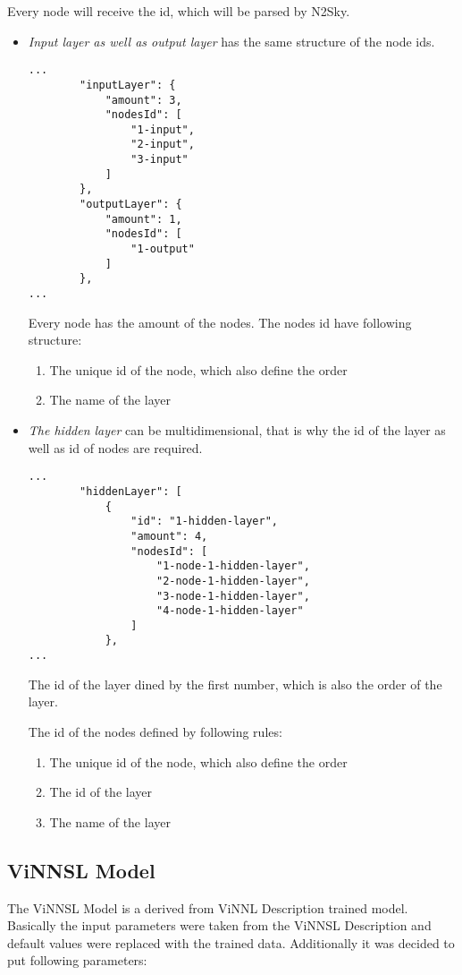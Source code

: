 Every node will receive the id, which will be parsed by N2Sky.

\begin{itemize}
\item \emph{Input layer as well as output layer} has the same structure of the node ids.
 \begin{lstlisting}
...
		"inputLayer": {
			"amount": 3,
			"nodesId": [
				"1-input",
				"2-input",
				"3-input"
			]
		},
		"outputLayer": {
			"amount": 1,
			"nodesId": [
				"1-output"
			]
		},
...
\end{lstlisting}

Every node has the amount of the nodes. The nodes id have following structure: 
\begin{enumerate}
\item The unique id of the node, which also define the order
\item The name of the layer
\end{enumerate}
\item \emph{The hidden layer} can be multidimensional, that is why the id of the layer as well as id of nodes are required.

 \begin{lstlisting}
...
		"hiddenLayer": [
			{
				"id": "1-hidden-layer",
				"amount": 4,
				"nodesId": [
					"1-node-1-hidden-layer",
					"2-node-1-hidden-layer",
					"3-node-1-hidden-layer",
					"4-node-1-hidden-layer"
				]
			},
...
\end{lstlisting}

The id of the layer dined by the first number, which is also the order of the layer.

The id of the nodes defined by following rules:
\begin{enumerate}
\item The unique id of the node, which also define the order
\item The id of the layer
\item The name of the layer
\end{enumerate}

\end{itemize}


\subsection{ViNNSL Model}\label{ViNNSL Model}

The ViNNSL Model is a derived from ViNNL Description trained model. Basically the input parameters were taken from the ViNNSL Description and default values were replaced with the trained data. Additionally it was decided to put following parameters:


